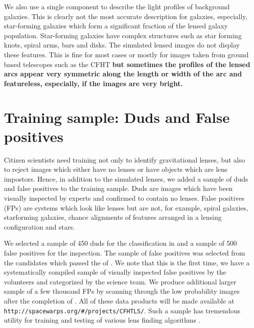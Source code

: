 \documentclass[useAMS,usenatbib,a4paper]{mn2e}
\begin{document}
We also use a single component to describe the light profiles of
background galaxies. This is clearly not the most accurate description for
galaxies, especially, star-forming galaxies which form a significant fraction
of the lensed galaxy population. Star-forming galaxies have complex structures
such as star forming knots, spiral arms, bars and disks. The simulated lensed
images do not display these features. This is fine for most cases or
mostly for images taken from ground based telescopes such as the CFHT
{\bf but sometimes the profiles of the lensed arcs appear very symmetric along the
length or width of the arc and featureless, especially, if the images
are very bright.}


\section{Training sample: Duds and False positives}
\label{sec:dfp}

Citizen scientists need training not only to identify gravitational
lenses, but also to reject images which either have no lenses or have
objects which are lens impostors. Hence, in addition to the simulated
lenses, we added a sample of duds and false positives to the training
sample. Duds are images which have been visually inspected by experts
and confirmed to contain no lenses. False positives (FPs) are systems
which look like lenses but are not, for example, spiral galaxies,
starforming galaxies, chance alignments of features arranged in a
lensing configuration and stars.

We selected a sample of 450 duds for the \StageOne classification in \sw
and a sample of 500 false positives for the \StageTwo inspection. The
sample of false positives was selected from the candidates which passed
the \StageOne of \sw. We note that this is the first time, we have a
systematically compiled sample of visually inspected false positives by
the \sw volunteers and categorized by the science team. We produce
additional larger sample of a few thousand FPs by scanning through the
low probability images after the completion of \StageTwo. All of these
data products will be made available at
\texttt{http://spacewarps.org/\#/projects/CFHTLS/}. Such a sample has tremendous
utility for training and testing of various lens finding algorithms
\citep[e.g.,][]{Chan2014}.
\end{document}
